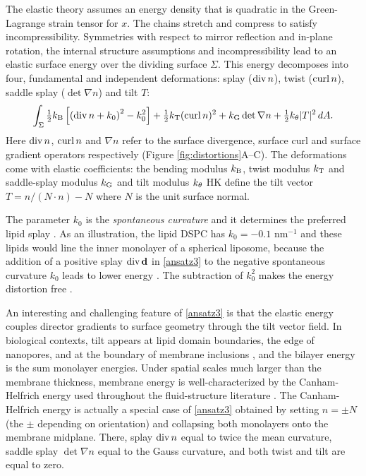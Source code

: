 The elastic theory assumes an energy density that is quadratic in the Green-Lagrange strain tensor for $x$. 
The chains stretch and compress to satisfy incompressibility.
Symmetries with respect to mirror reflection and in-plane rotation, the internal structure assumptions and incompressibility
lead to an elastic surface energy over the dividing surface $\Sigma$. 
This energy decomposes into four, fundamental and independent deformations:
splay ($\operatorname{div} n$), twist ($\operatorname{curl} n$), saddle splay ($\det \nabla n$) and tilt $T$:
\begin{equation}
\label{ansatz3}
\begin{aligned}
\int_{\Sigma} 
  \tfrac{1}{2}k_{\mathrm{B}}\left[ \left( \operatorname{div} n + k_0\right)^2 - k_0^2\right] 
+ \tfrac{1}{2}k_{\mathrm{T}} (\operatorname{curl} n)^2 + k_{\mathrm{G}}  \det \nabla n + \tfrac{1}{2}k_{\theta} |T|^2 \,dA.
\end{aligned}
\end{equation}
Here $\operatorname{div} n$, $\operatorname{curl} n$ and $\nabla n$ refer to the surface divergence, surface curl and surface gradient operators
respectively (Figure \ref{fig:distortions}A--C).
The deformations come with elastic coefficients: the bending modulus $k_{\mathrm{B}}$, twist modulus $k_{\mathrm{T}}$ 
and saddle-splay modulus $k_{\mathrm{G}}$ and tilt modulus $k_{\theta}$
HK define the tilt vector $T = n/(N\cdot n) - N$ where $N$ is the unit surface normal.

The parameter $k_0$ is the \emph{spontaneous curvature} and it determines the preferred lipid splay \cite{RoLi15,Kozlov2007}. 
As an illustration, the lipid DSPC has $k_0 = -0.1$ nm$^{-1}$ 
and these lipids would line the  inner monolayer of a 
spherical liposome, because the addition of a positive splay $\operatorname{div} \mathbf{d}$  in \eqref{ansatz3}
to the negative spontaneous curvature $k_0$ leads to lower energy \cite{Kamal22245, C3SM51829A, RoLi15,FriedSeguin15}.
The subtraction of $k_0^2$ makes the energy distortion free
\cite{Helfrich73,PhysRevLett.113.248102,Hamm2000}.

An interesting and challenging feature of \eqref{ansatz3} is that
the elastic energy couples director gradients to surface geometry through the tilt vector field.
In biological contexts, tilt appears at lipid domain boundaries, the edge of nanopores, and at the boundary of membrane inclusions \cite{https://doi.org/10.1103/PhysRevE.102.042406}, and the bilayer energy is the sum monolayer energies. 
Under spatial scales much larger than the membrane thickness, membrane energy is well-characterized by
the Canham-Helfrich energy used throughout the fluid-structure literature \cite{}.
The Canham-Helfrich energy is actually a special case of \eqref{ansatz3} obtained by setting $n =  \pm N$ (the $\pm$ depending
on orientation) and collapsing both monolayers onto the membrane midplane. There,
splay $\operatorname{div} n$ equal to twice the mean curvature, saddle splay $\det \nabla n$ equal to the Gauss curvature,
and both twist and tilt are equal to zero. 



